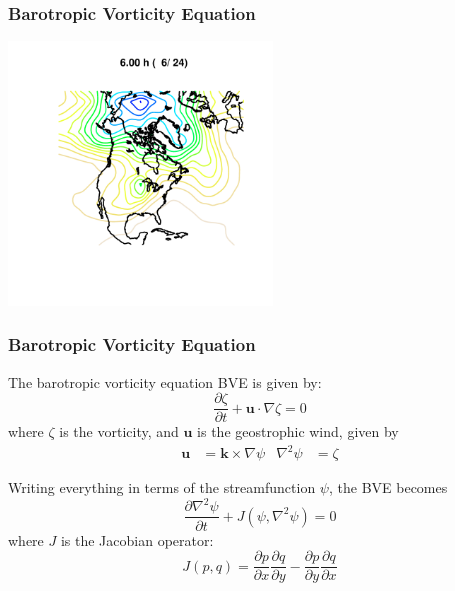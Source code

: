 \documentclass[aspectratio=43,9pt]{beamer}
\begin{document}
\begin{frame}
	\frametitle{Barotropic Vorticity Equation}
	\begin{center}
		\includegraphics[width=7cm]{barovort}
	\end{center}
\end{frame}
%
%
\begin{frame}
	\frametitle{Barotropic Vorticity Equation}
	\begin{myitemize}{2ex}
		\item The barotropic vorticity equation BVE is given by:
			\begin{equation*}
				\frac{\partial \zeta}{\partial t}+\bm u\cdot\nabla\zeta=0
			\end{equation*}
			where $\zeta$ is the vorticity, and $\bm u$ is the geostrophic wind, given by
			\begin{align*}
				\bm u&=\bm k\times\nabla\psi		&		\nabla^2\psi&=\zeta
			\end{align*}
		\item Writing everything in terms of the streamfunction $\psi$, the BVE becomes
			\begin{equation*}
				\frac{\partial\nabla^2\psi}{\partial t}+J(\psi,\nabla^2\psi)=0
			\end{equation*}
			where $J$ is the Jacobian operator:
			\begin{equation*}
				J(p,q)=\frac{\partial p}{\partial x}\frac{\partial q}{\partial y}-\frac{\partial p}{\partial y}\frac{\partial q}{\partial x}
			\end{equation*}
	\end{myitemize}
\end{frame}
%
%
\end{document}
